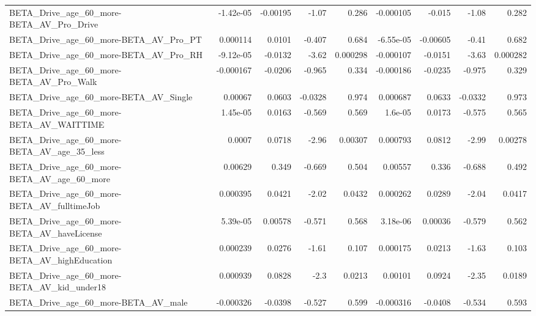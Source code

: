 \begin{tabular}{lrrrrrrrr}
BETA\_Drive\_age\_60\_more-BETA\_AV\_Pro\_Drive           &   -1.42e-05 &     -0.00195 &     -1.07 &    0.286 &  -0.000105 &      -0.015 &        -1.08 &         0.282 \\
BETA\_Drive\_age\_60\_more-BETA\_AV\_Pro\_PT              &    0.000114 &       0.0101 &    -0.407 &    0.684 &  -6.55e-05 &    -0.00605 &        -0.41 &         0.682 \\
BETA\_Drive\_age\_60\_more-BETA\_AV\_Pro\_RH              &   -9.12e-05 &      -0.0132 &     -3.62 & 0.000298 &  -0.000107 &     -0.0151 &        -3.63 &      0.000282 \\
BETA\_Drive\_age\_60\_more-BETA\_AV\_Pro\_Walk            &   -0.000167 &      -0.0206 &    -0.965 &    0.334 &  -0.000186 &     -0.0235 &       -0.975 &         0.329 \\
BETA\_Drive\_age\_60\_more-BETA\_AV\_Single              &     0.00067 &       0.0603 &   -0.0328 &    0.974 &   0.000687 &      0.0633 &      -0.0332 &         0.973 \\
BETA\_Drive\_age\_60\_more-BETA\_AV\_WAITTIME            &    1.45e-05 &       0.0163 &    -0.569 &    0.569 &    1.6e-05 &      0.0173 &       -0.575 &         0.565 \\
BETA\_Drive\_age\_60\_more-BETA\_AV\_age\_35\_less         &      0.0007 &       0.0718 &     -2.96 &  0.00307 &   0.000793 &      0.0812 &        -2.99 &       0.00278 \\
BETA\_Drive\_age\_60\_more-BETA\_AV\_age\_60\_more         &     0.00629 &        0.349 &    -0.669 &    0.504 &    0.00557 &       0.336 &       -0.688 &         0.492 \\
BETA\_Drive\_age\_60\_more-BETA\_AV\_fulltimeJob         &    0.000395 &       0.0421 &     -2.02 &   0.0432 &   0.000262 &      0.0289 &        -2.04 &        0.0417 \\
BETA\_Drive\_age\_60\_more-BETA\_AV\_haveLicense         &    5.39e-05 &      0.00578 &    -0.571 &    0.568 &   3.18e-06 &     0.00036 &       -0.579 &         0.562 \\
BETA\_Drive\_age\_60\_more-BETA\_AV\_highEducation       &    0.000239 &       0.0276 &     -1.61 &    0.107 &   0.000175 &      0.0213 &        -1.63 &         0.103 \\
BETA\_Drive\_age\_60\_more-BETA\_AV\_kid\_under18         &    0.000939 &       0.0828 &      -2.3 &   0.0213 &    0.00101 &      0.0924 &        -2.35 &        0.0189 \\
BETA\_Drive\_age\_60\_more-BETA\_AV\_male                &   -0.000326 &      -0.0398 &    -0.527 &    0.599 &  -0.000316 &     -0.0408 &       -0.534 &         0.593 \\

\end{tabular}
